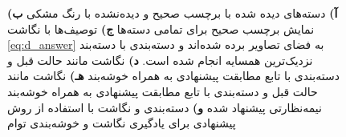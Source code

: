 \begin{figure}[t]
{  \textbf{آ)}
   دسته‌های دیده شده با برچسب صحیح و دیده‌نشده با رنگ مشکی
\textbf{ب)}
 نمایش برچسب صحیح برای تمامی دسته‌ها
  \textbf{ج)} توصیف‌ها با نگاشت \eqref{eq:d_answer}
  به فضای تصاویر برده شده‌اند و دسته‌بندی با دسته‌بند نزدیک‌ترین همسایه انجام شده است.
  \textbf{د)}
   نگاشت مانند حالت قبل و دسته‌بندی با تابع مطابقت پیشنهادی به همراه خوشه‌بند 
  \textbf{هـ)}
   نگاشت مانند حالت قبل و دسته‌بندی با تابع مطابقت پیشنهادی به همراه خوشه‌بند نیمه‌نظارتی پیشنهاد شده
  \textbf{و)}
  دسته‌بندی و نگاشت با استفاده از روش پیشنهادی برای یادگیری نگاشت و خوشه‌بندی توام
  }
\label{fig:discussion}
\end{figure}
